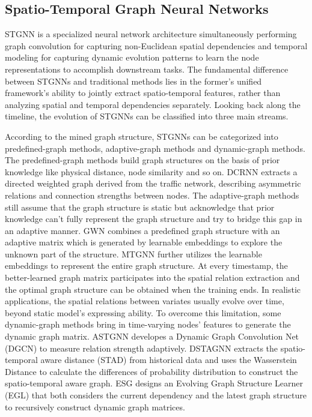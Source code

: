 \documentclass[final,12pt]{elsarticle}
\begin{document}
\subsection{Spatio-Temporal Graph Neural Networks}
\label{subsec-2.2}


STGNN is a specialized neural network architecture 
simultaneously performing 
graph convolution for capturing non-Euclidean spatial dependencies 
and temporal modeling for capturing dynamic evolution patterns 
to learn the node representations to accomplish downstream tasks.  %
The fundamental difference between STGNNs and traditional methods 
lies in the former's unified framework's ability 
to jointly extract spatio-temporal features, 
rather than analyzing spatial and temporal dependencies separately.  %
Looking back along the timeline, 
the evolution of STGNNs can be classified into three main streams.  %


According to the mined graph structure, 
STGNNs can be categorized into 
predefined-graph methods, adaptive-graph methods and dynamic-graph methods.  %
The predefined-graph methods build graph structures 
on the basis of prior knowledge like physical distance, node similarity and so on.  %
DCRNN \cite{li2017diffusion} extracts a directed weighted graph derived from the traffic network, 
describing asymmetric relations and connection strengths between nodes.  %
The adaptive-graph methods still assume that the graph structure is static 
but acknowledge that prior knowledge can't fully represent the graph structure 
and try to bridge this gap in an adaptive manner.  %
GWN \cite{wu2019graph} combines a predefined graph structure with an adaptive matrix 
which is generated by learnable embeddings to explore the unknown part of the structure.  %
MTGNN \cite{wu2020connecting} further utilizes the learnable embeddings 
to represent the entire graph structure.  %
At every timestamp, the better-learned graph matrix 
participates into the spatial relation extraction and 
the optimal graph structure can be obtained when the training ends.  %
In realistic applications, the spatial relations between variates 
usually evolve over time, beyond static model's expressing ability.
To overcome this limitation, some dynamic-graph methods 
bring in time-varying nodes' features to generate the dynamic graph matrix.  %
ASTGNN \cite{guo2021learning} developes a Dynamic Graph Convolution Net (DGCN) 
to measure relation strength adaptively.  %
DSTAGNN \cite{lan2022dstagnn} extracts the spatio-temporal aware distance (STAD) 
from historical data and 
uses the Wasserstein Distance to calculate the differences of probability distribution 
to construct the spatio-temporal aware graph.  %
ESG \cite{ye2022learning} designs an Evolving Graph Structure Learner (EGL) 
that both considers the current dependency 
and the latest graph structure 
to recursively construct dynamic graph matrices.  %
\end{document}
